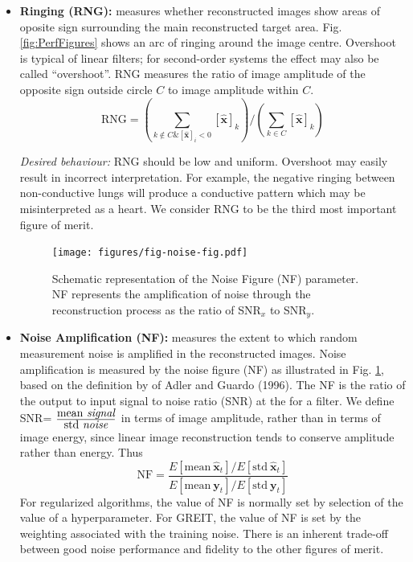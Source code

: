 \documentclass[12pt]{iopart}
\newcommand{\xH}{\mbox{$\mathbf{\hat x}$}}
\newcommand{\yB}{\mbox{$\mathbf{y}$}}
\begin{document}
\begin{itemize}
\hspace{5mm}
{\em Desired behaviour:}
SD should be low and uniform. Large SD may result in
incorrect interpretation of images, although this
effect is less important than other artefacts. We 
consider SD to be the fifth most important figure 
of merit.

\item
{\bf Ringing (RNG):}
measures whether reconstructed images show
areas of oposite sign surrounding the main 
reconstructed target area. Fig. \ref{fig:PerfFigures}
shows an arc of ringing around the image centre.
Overshoot is typical of linear filters; for second-order
systems the effect may also be called ``overshoot''.
RNG measures the ratio of image amplitude of
the opposite sign outside circle $C$ to image
amplitude within $C$.
\begin{equation}
\mathrm{RNG} =
\left(
        \sum_{k\not\in C \& [\xH]_i < 0} [\xH]_k 
\right)
/ 
\left(
        \sum_{k\in C}                    [\xH]_k 
\right)
\end{equation}

\hspace{5mm}
{\em Desired behaviour:}
RNG should be low and uniform. Overshoot may
easily result in incorrect interpretation. For
example, the negative ringing between non-conductive
lungs will produce a conductive pattern which 
may be misinterpreted as a heart.
We consider RNG to be the third most important figure 
of merit.

\begin{figure}[bhtp]
\begin{center}
\texttt{[image: figures/fig-noise-fig.pdf]}
\caption{ \label{fig:noise_fig}
Schematic representation of the Noise Figure (NF)
parameter. NF represents the amplification of noise through
the reconstruction process as the ratio of SNR$_x$ to SNR$_y$.
}
\end{center}
\end{figure}

\item
{\bf Noise Amplification (NF):}
measures the extent to which random
measurement noise is amplified
in the reconstructed images. Noise amplification
is measured by the noise figure (NF) as
illustrated in Fig. \ref{fig:noise_fig}, 
based on the definition by of Adler and Guardo (1996).
The NF is the ratio of the output to input
 signal to noise ratio (SNR) at the for a filter.
We define SNR=
$\frac{
   \mbox{mean \em signal}
      }{
   \mbox{std \em noise}
     }
$ 
in terms of image amplitude,
rather than in terms of image energy, since linear
image reconstruction tends to conserve  amplitude
rather than energy. Thus
\begin{equation}
\mathrm{NF} = \frac{
   E[ \mathrm{mean}~\xH_t ] 
         /
   E[ \mathrm{std}~\xH_t ]
}{
   E[ \mathrm{mean}~\yB_t ] 
         /
   E[ \mathrm{std}~\yB_t ]
}
\end{equation}
For regularized algorithms, the value of NF is normally
set by selection of the value of 
a hyperparameter. For GREIT, the value of NF is set by the weighting
associated with the training noise. There is an inherent
trade-off between good noise performance and fidelity to
the other figures of merit.


\end{itemize}
\end{document}
